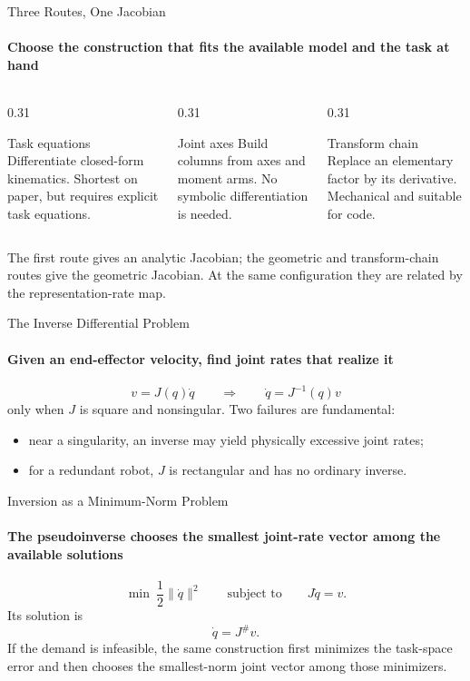 \documentclass[aspectratio=169]{beamer}
\begin{document}
\begin{frame}[t]{Three Routes, One Jacobian}
    \framesubtitle{Choose the construction that fits the available model and the task at hand}
    \begin{columns}[T,onlytextwidth]
        \begin{column}{0.31\textwidth}
            \begin{block}{Task equations}
                Differentiate closed-form kinematics. Shortest on paper, but requires explicit task equations.
            \end{block}
        \end{column}
        \begin{column}{0.31\textwidth}
            \begin{block}{Joint axes}
                Build columns from axes and moment arms. No symbolic differentiation is needed.
            \end{block}
        \end{column}
        \begin{column}{0.31\textwidth}
            \begin{block}{Transform chain}
                Replace an elementary factor by its derivative. Mechanical and suitable for code.
            \end{block}
        \end{column}
    \end{columns}
    The first route gives an analytic Jacobian; the geometric and transform-chain routes give the geometric Jacobian. At the same configuration they are related by the representation-rate map.
\end{frame}

\begin{frame}[t]{The Inverse Differential Problem}
    \framesubtitle{Given an end-effector velocity, find joint rates that realize it}
    \[
        v=J(q)\dot q
        \qquad\Rightarrow\qquad
        \dot q=J^{-1}(q)v
    \]
    only when $J$ is square and nonsingular. Two failures are fundamental:
    \begin{itemize}
        \item near a singularity, an inverse may yield physically excessive joint rates;
        \item for a redundant robot, $J$ is rectangular and has no ordinary inverse.
    \end{itemize}
\end{frame}

\begin{frame}[t]{Inversion as a Minimum-Norm Problem}
    \framesubtitle{The pseudoinverse chooses the smallest joint-rate vector among the available solutions}
    \[
        \min\ \frac12\|\dot q\|^2
        \qquad\text{subject to}\qquad J\dot q=v.
    \]
    Its solution is
    \[
        \dot q=J^{\#}v.
    \]
    If the demand is infeasible, the same construction first minimizes the task-space error and then chooses the smallest-norm joint vector among those minimizers.
\end{frame}
\end{document}
